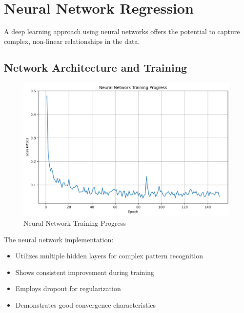 \section{Neural Network Regression}
A deep learning approach using neural networks offers the potential to capture complex, non-linear relationships in the data.

\subsection{Network Architecture and Training}
\begin{figure}[H]
    \centering
    \includegraphics[width=1.0\textwidth]{../figures/neural_network_training.png}
    \caption{Neural Network Training Progress}
    \label{fig:nn_training}
\end{figure}

The neural network implementation:
\begin{itemize}
    \item Utilizes multiple hidden layers for complex pattern recognition
    \item Shows consistent improvement during training
    \item Employs dropout for regularization
    \item Demonstrates good convergence characteristics
\end{itemize}

